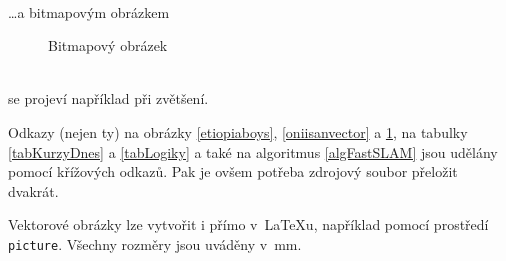\documentclass[11pt,a4paper]{article}
\begin{document}
\\\dots  a bitmapovým obrázkem
\begin{figure}[ht]
  \begin{center}
  \caption{Bitmapový obrázek}
  \label{oniisanbitmap}
  \end{center}
\end{figure}
\\se projeví například při zvětšení.

Odkazy (nejen ty) na obrázky \ref{etiopiaboys}, \ref{oniisanvector} a \ref{oniisanbitmap}, na tabulky \ref{tabKurzyDnes} a \ref{tabLogiky} a také na algoritmus \ref{algFastSLAM} jsou udělány pomocí křížových odkazů. Pak je ovšem potřeba zdrojový soubor přeložit dvakrát.

Vektorové obrázky lze vytvořit i přímo v~\LaTeX u, například pomocí prostředí \texttt{picture}. Všechny rozměry
jsou uváděny v~mm.
\end{document}

